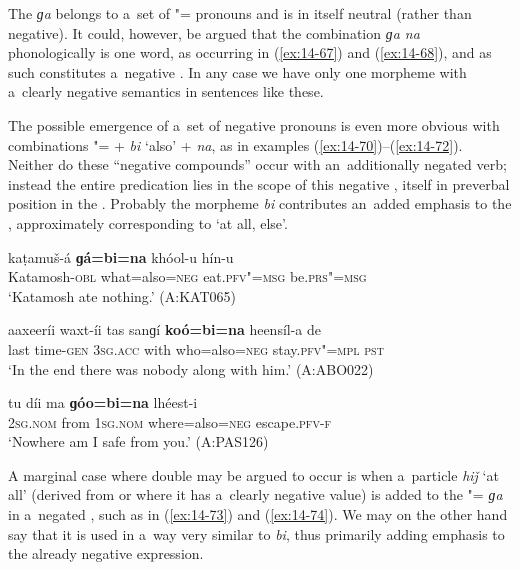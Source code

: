 The  \textit{ɡa} belongs to a~set of "= pronouns and is in itself neutral (rather than negative). It could, however, be argued that the combination \textit{ɡa na} phonologically is one word, as occurring in (\ref{ex:14-67}) and (\ref{ex:14-68}), and as such constitutes a~negative . In any case we have only one morpheme with a~clearly negative semantics in sentences like these. 



The possible emergence of a~set of negative pronouns is even more obvious with combinations "=  + \textit{bi} `also' + \textit{na}, as in examples (\ref{ex:14-70})--(\ref{ex:14-72}). Neither do these ``negative compounds'' occur with an~additionally negated verb; instead the entire predication lies in the scope of this negative , itself in preverbal position in the . Probably the morpheme \textit{bi} contributes an~added emphasis to the , approximately corresponding to `at all, else'.

\begin{exe}
\ex
\label{ex:14-70}
\gll kaṭamuš-á \textbf{ɡá=bi=na} khóol-u hín-u \\
Katamosh-\textsc{obl} what=also=\textsc{neg} eat.\textsc{pfv"=msg } be.\textsc{prs"=msg} \\
\glt `Katamosh ate nothing.' (A:KAT065)

\ex
\label{ex:14-71}
\gll aaxeeríi waxt-íi tas sanɡí \textbf{koó=bi=na} heensíl-a  de \\
last time-\textsc{gen} \textsc{3sg.acc} with who=also=\textsc{neg} stay.\textsc{pfv"=mpl}  \textsc{pst} \\
\glt `In the end there was nobody along with him.' (A:ABO022)

\ex
\label{ex:14-72}
\gll tu díi ma \textbf{ɡóo=bi=na} lhéest-i \\
\textsc{2sg.nom} from \textsc{1sg.nom} where=also=\textsc{neg} escape.\textsc{pfv-f}  \\
\glt `Nowhere am I safe from you.' (A:PAS126)
\end{exe}

A marginal case where double  may be argued to occur is when a~particle \textit{hiǰ} `at all' (derived from \iliPersian or \iliPashto where it has a~clearly negative value) is added to the "= \textit{ɡa} in a~negated , such as in (\ref{ex:14-73}) and (\ref{ex:14-74}). We may on the other hand say that it is used in a~way very similar to \textit{bi}, thus primarily adding emphasis to the already negative expression.

